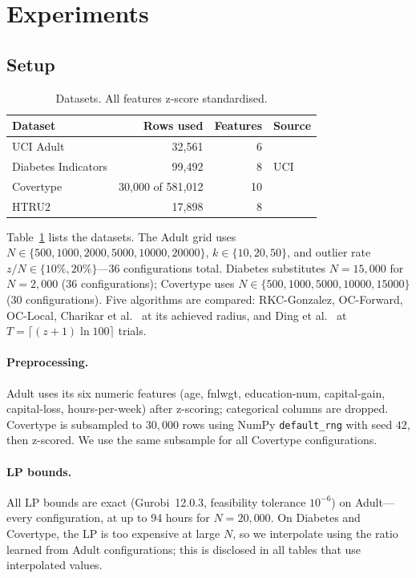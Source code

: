 \documentclass{siam}
\begin{document}
\section{Experiments}
\label{sec:experiments}

\subsection{Setup}
\label{sec:expsetup}

\begin{table}[t]
\caption{Datasets. All features z-score standardised.}
\label{tab:datasets}
\centering
\begin{tabular}{lrrl}
\toprule
Dataset & Rows used & Features & Source \\
\midrule
UCI Adult & 32{,}561 & 6 & \cite{adult_dataset} \\
Diabetes Indicators & 99{,}492 & 8 & UCI \\
Covertype & 30{,}000 of 581{,}012 & 10 & \cite{covertype_dataset} \\
HTRU2 & 17{,}898 & 8 & \cite{htru2} \\
\bottomrule
\end{tabular}
\end{table}

Table~\ref{tab:datasets} lists the datasets. The Adult grid uses
$N\in\{500,1000,2000,5000,10000,20000\}$, $k\in\{10,20,50\}$, and
outlier rate $z/N\in\{10\%,20\%\}$---36 configurations total. Diabetes
substitutes $N=15{,}000$ for $N=2{,}000$ (36 configurations); Covertype
uses $N\in\{500,1000,5000,10000,15000\}$ (30 configurations). Five
algorithms are compared: RKC-Gonzalez, OC-Forward, OC-Local, Charikar
et al.\ \cite{charikar2001} at its achieved radius, and Ding et al.\
\cite{ding2019} at $T=\lceil(z{+}1)\ln 100\rceil$ trials.

\paragraph{Preprocessing.}
Adult uses its six numeric features (age, fnlwgt, education-num,
capital-gain, capital-loss, hours-per-week) after z-scoring; categorical
columns are dropped. Covertype is subsampled to $30{,}000$ rows using
NumPy \texttt{default\_rng} with seed $42$, then z-scored. We use the
same subsample for all Covertype configurations.

\paragraph{LP bounds.}
All LP bounds are exact (Gurobi~12.0.3, feasibility tolerance
$10^{-6}$) on Adult---every configuration, at up to 94 hours for
$N=20{,}000$. On Diabetes and Covertype, the LP is too expensive at
large $N$, so we interpolate using the ratio learned from Adult
configurations; this is disclosed in all tables that use interpolated
values.
\end{document}
